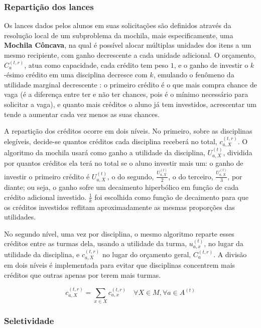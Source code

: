 \documentclass[
    12pt,
    openany,
    oneside,
    a4paper,
    english,
    brazil
]{abntex2}
\begin{document}
\subsubsection{Repartição dos lances}

Os lances dados pelos alunos em suas solicitações são definidos através da resolução local de um subproblema da mochila, mais especificamente, uma \textbf{Mochila Côncava}, na qual é possível alocar múltiplas unidades dos itens a um mesmo recipiente, com ganho decrescente a cada unidade adicional. O orçamento, $C_a^{(t, r)}$, atua como capacidade, cada crédito tem peso $1$, e o ganho de investir o $k$-ésimo crédito em uma disciplina decresce com $k$, emulando o fenômeno da utilidade marginal decrescente \cite{???}: o primeiro crédito é o que mais compra chance de vaga (é a diferença entre ter e não ter chances, pois é o mínimo necessário para solicitar a vaga), e quanto mais créditos o aluno já tem investidos, acrescentar um tende a aumentar cada vez menos as suas chances.

A repartição dos créditos ocorre em dois níveis. No primeiro, sobre as disciplinas elegíveis, decide-se quantos créditos cada disciplina receberá no total, $c_{a, X}^{(t, r)}$. O algoritmo da mochila usará como ganho a utilidade da disciplina, $U_{a, X}^{(t)}$, dividida por quantos créditos ela terá no total se o aluno investir mais um: o ganho de investir o primeiro crédito é $U_{a, X}^{(t)}$, o do segundo, $\frac{U_{a, X}^{(t)}}{2}$, o do terceiro, $\frac{U_{a, X}^{(t)}}{3}$, por diante; ou seja, o ganho sofre um decaimento hiperbólico em função de cada crédito adicional investido. $\frac{1}{k}$ foi escolhida como função de decaimento para que os créditos investidos reflitam aproximadamente as mesmas proporções das utilidades.

No segundo nível, uma vez por disciplina, o mesmo algoritmo reparte esses créditos entre as turmas dela, usando a utilidade da turma, $u_{a, x}^{(t)}$, no lugar da utilidade da disciplina, e $c_{a, X}^{(t, r)}$ no lugar do orçamento geral, $C_a^{(t, r)}$. A divisão em dois níveis é implementada para evitar que disciplinas concentrem mais créditos que outras apenas por terem mais turmas.

\begin{equation}
    c_{a, X}^{(t, r)} = \sum_{x \in X} c_{a, x}^{(t, r)}
    \quad \forall X \in M, \forall a \in A^{(t)}
\end{equation}

\subsubsection{Seletividade}
\end{document}
